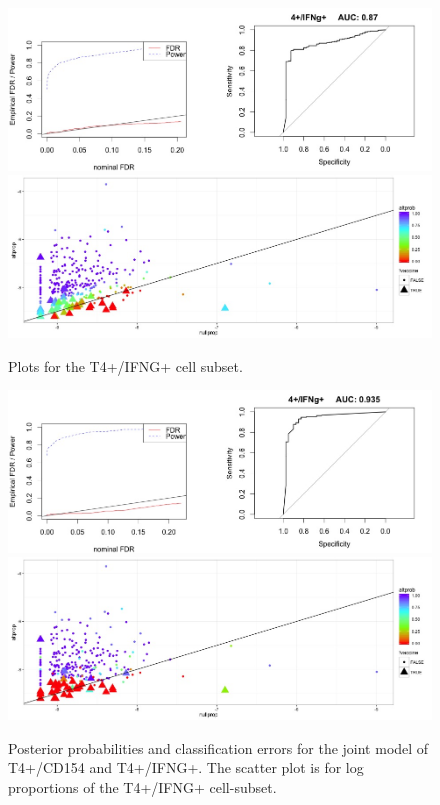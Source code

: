 \documentclass{article}\usepackage[]{graphicx}\usepackage[]{color}
\makeatletter
\def\maxwidth{ %
  \ifdim\Gin@nat@width>\linewidth
    \linewidth
  \else
    \Gin@nat@width
  \fi
}
\makeatother
\begin{document}
\begin{figure}
\includegraphics[width=\maxwidth]{figures/t4ifngroc} 
\includegraphics[width=\maxwidth]{figures/t4ifngscatter} \caption[]{Plots for the T4+/IFNG+ cell subset.}
\label{IFNG}
\end{figure}

\begin{figure}
\includegraphics[width=\maxwidth]{figures/jointroc} 
\includegraphics[width=\maxwidth]{figures/jointscatter} \caption[]{Posterior probabilities and classification errors for the joint model of T4+/CD154 and T4+/IFNG+. The scatter plot is for log proportions of the T4+/IFNG+ cell-subset.}
\label{jointModel}
\end{figure}
\end{document}
